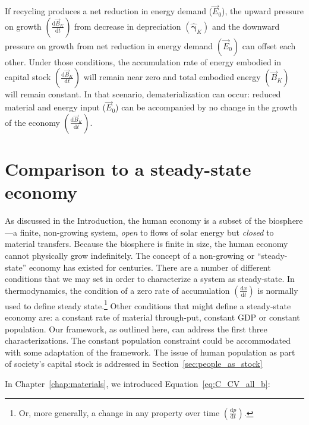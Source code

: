 If recycling produces a net reduction in energy demand ($\vec{E}_{0}$), 
the upward pressure on growth 
$\left(\frac{\mathrm{d}\vec{B}_{K}}{\mathrm{d}t}\right)$ 
from decrease in depreciation 
$\left(\hat{\bm{\gamma}}_{K}\right)$ 
and the downward pressure on growth 
from net reduction in energy demand 
$\left(\vec{E}_{0}\right)$ 
can offset each other.
Under those conditions, 
the accumulation rate of energy embodied in capital stock
$\left(\frac{\mathrm{d}\vec{B}_{K}}{\mathrm{d}t}\right)$ 
will remain near zero 
and total embodied energy 
$(\vec{B}_{K})$ will remain constant. 
In that scenario, 
dematerialization can occur: 
reduced material and energy input ($\vec{E}_{0}$) 
can be accompanied by 
no change in
the growth of the economy
$\left(\frac{\mathrm{d}\vec{B}_{K}}{\mathrm{d}t}\right)$.


\section{Comparison to a steady-state economy}
\label{sec:SSE}

As discussed in the Introduction,
the human economy is a subset of the biosphere---a
finite, non-growing system,
\emph{open} to flows of solar energy but \emph{closed}
to material transfers.
Because the biosphere is finite in size,
the human economy cannot physically grow indefinitely.
The concept of a non-growing or ``steady-state'' economy
has existed for centuries.
There are a number of different
conditions that we may set
in order to characterize a system as steady-state.
In thermodynamics,
the condition of a zero rate of accumulation
$\left(\frac{\mathrm{d}x}{\mathrm{d}t}\right)$
is normally used to define steady state.\footnote{Or,
more generally,
a change in any property over time
$\left(\frac{\mathrm{d}p}{\mathrm{d}t}\right)$.}
Other conditions that might define a steady-state
economy are:
a constant rate of material through-put,
constant GDP or constant population.
Our framework,
as outlined here,
can address the first three characterizations.
The constant population constraint could be
accommodated with some adaptation of the 
framework. 
The issue of human population as part of society's
capital stock is addressed in Section~\ref{sec:people_as_stock}

In Chapter~\ref{chap:materials}, 
we introduced Equation~\ref{eq:C_CV_all_b}:

